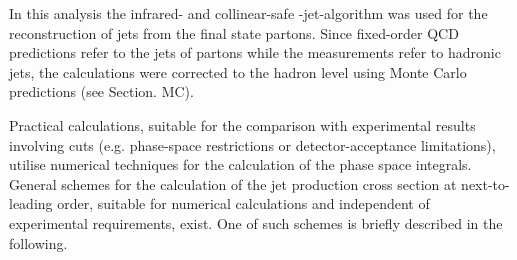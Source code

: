 In this analysis the infrared- and collinear-safe \kt-jet-algorithm was used for the reconstruction of jets from the final state partons. Since fixed-order QCD predictions refer to the jets of partons while the measurements refer to hadronic jets, the calculations were corrected to the hadron level using Monte Carlo predictions (see Section. MC).

Practical calculations, suitable for the comparison with experimental results involving cuts (e.g. phase-space restrictions or detector-acceptance limitations), utilise numerical techniques for the calculation of the phase space integrals. General schemes for the calculation of the jet production cross section at next-to-leading order, suitable for numerical calculations and independent of experimental requirements, exist. One of such schemes is briefly described in the following. 